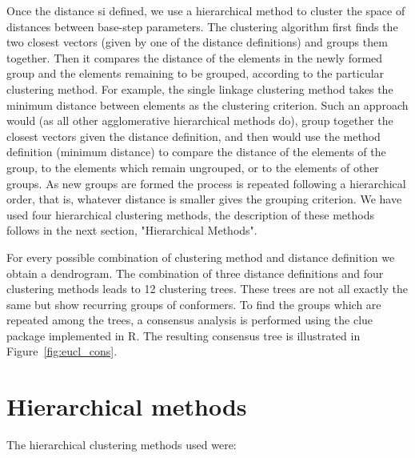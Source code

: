 \noindent Once the  distance si defined, we use  a hierarchical method
to cluster the space of distances between base-step parameters.
The clustering algorithm first finds the two closest vectors (given by
one of  the distance  definitions) and groups  them together.  Then it
compares the  distance of the elements  in the newly  formed group and
the  elements remaining  to be  grouped, according  to  the particular
clustering method.  For example,  the single linkage clustering method
takes  the  minimum  distance   between  elements  as  the  clustering
criterion.   Such  an  approach  would  (as  all  other  agglomerative
hierarchical methods do), group together the closest vectors given the
distance definition, and then would use the method definition (minimum
distance) to compare the distance of the elements of the group, to the
elements  which  remain  ungrouped,   or  to  the  elements  of  other
groups. As new  groups are formed the process  is repeated following a
hierarchical order,  that is, whatever  distance is smaller  gives the
grouping  criterion.   We   have  used  four  hierarchical  clustering
methods, the description of these methods follows in the next section,
"Hierarchical Methods".

For  every  possible combination  of  clustering  method and  distance
definition we  obtain a dendrogram. The combination  of three distance
definitions and four clustering  methods leads to 12 clustering trees.
These trees are not all exactly  the same but show recurring groups of
conformers.  To find the groups  which are repeated among the trees, a
consensus  analysis  is  performed  using  the  \textsf{clue}  package
\cite{hornik2005} implemented  in \textsf{R}. The  resulting consensus
tree is illustrated in Figure~\ref{fig:eucl_cons}.

\section{Hierarchical methods}
The hierarchical clustering methods used were:

